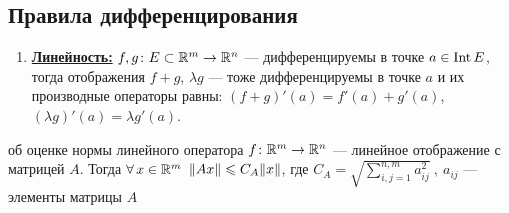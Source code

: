 \subsection{Правила дифференцирования}

\begin{enumerate} %
	\item \href{https://www.youtube.com/live/9KZRjeVTXNY?si=Hcxa5JDA7wVkfMRg&t=7995}{\textbf{Линейность:}}
	$f, g\colon E\subset\mathbb R^m \to \mathbb R^n$ --- дифференцируемы в точке $a \in \mathrm{Int}\, E$,
	тогда отображения $f + g$, $\lambda g$ --- тоже дифференцируемы в точке $a$ 
	и их производные операторы равны: 
	$(f + g)'(a) = f'(a) + g'(a)$, 
	$(\lambda g)'(a) = \lambda g'(a)$.
\end{enumerate}

\begin{lem}[https://www.youtube.com/live/9KZRjeVTXNY?si=-WLmW4M02oNemOzS&t=8181]{об оценке нормы линейного оператора}\label{оц.нормы}
	$f\colon \mathbb R^m \to \mathbb R^n$ --- линейное отображение с матрицей $A$. Тогда $\forall \, x \in \mathbb R^m$ $\|Ax\|\leqslant C_A \|x\|$, где $C_A = \sqrt{\sum\limits_{i, j = 1}^{n, m}a_{ij}^2}\ ,\ a_{ij}$ --- элементы матрицы $A$
\end{lem} %

